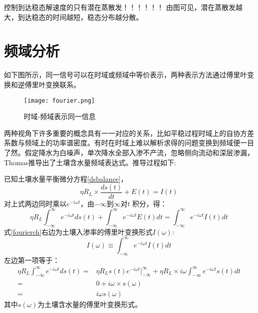  

控制到达稳态解速度的只有潜在蒸散发！！！！！！
由图可见，潜在蒸散发越大，到达稳态的时间越短，稳态分布越分散。

\fi









\section{频域分析}



如下图所示，同一信号可以在时域或频域中等价表示，两种表示方法通过傅里叶变换和逆傅里叶变换联系。
\begin{figure}[H]
\centering
\texttt{[image: fourier.png]}
\caption{时域-频域表示同一信息}
\end{figure}
两种视角下许多重要的概念具有一一对应的关系，比如平稳过程时域上的自协方差系数与频域上的功率谱密度。有时在时域上难以解析求得的问题变换到频域便一目了然\cite{boussinesq1903theorie,katul2007spectrum}。假定降水为白噪声，单次降水全部入渗不产流，忽略侧向流动和深层渗漏，Thomas\cite{delworth1988influence}推导出了土壤含水量频域表达式。推导过程如下: 

已知土壤水量平衡微分方程\ref{dsbalance}，
\begin{equation}
\label{dsbalance}
\eta R_L \times \frac{ds(t)}{dt}+E(t)=I(t)
\end{equation} 
对上式两边同时乘以$e^{-i\omega t}$，由$-\infty$到$\infty$对$t$ 积分，得：
\begin{equation}
\label{fourierch}
\eta R_L \int_{-\infty}^{\infty}e^{-i\omega t}ds(t)+\int_{-\infty}^{\infty}e^{-i\omega t}E(t)dt=\int_{-\infty}^{\infty}e^{-i\omega t}I(t)dt
\end{equation} 
式\ref{fourierch}右边为土壤入渗率的傅里叶变换形式$I(\omega)$:
\begin{equation}
\label{ppss}
I(\omega)\equiv \int_{-\infty}^{\infty}e^{-i\omega t}I(t)dt
\end{equation}
左边第一项等于：
\begin{equation}
\label{fs}
\begin{split}
\eta R_L \int_{-\infty}^{\infty}e^{-i \omega t}ds(t)=
&\eta R_L s(t)e^{-i\omega t}|_{-\infty}^{\infty}+\eta R_L \times i \omega  \int_{-\infty}^{\infty}e^{-i\omega t}s(t)dt\\=&0+i\omega \times  s(\omega)\\=&i\omega s(\omega)
\end{split}
\end{equation}
其中$s(\omega)$为土壤含水量的傅里叶变换形式。

